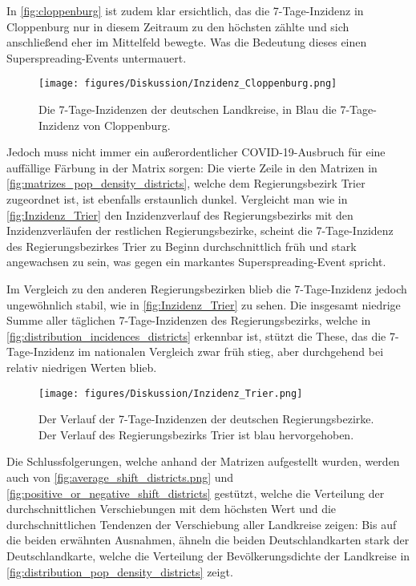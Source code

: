 In \autoref{fig:cloppenburg} ist zudem klar ersichtlich, das die 7-Tage-Inzidenz in Cloppenburg nur in diesem Zeitraum zu den höchsten zählte und sich anschließend eher im Mittelfeld bewegte. Was die Bedeutung dieses einen Superspreading-Events untermauert.
\begin{figure}
    \centering
    \texttt{[image: figures/Diskussion/Inzidenz\_Cloppenburg.png]}
    \caption{Die 7-Tage-Inzidenzen der deutschen Landkreise, in Blau die 7-Tage-Inzidenz von Cloppenburg.}
    \label{fig:cloppenburg}
\end{figure}

Jedoch muss nicht immer ein außerordentlicher COVID-19-Ausbruch für eine auffällige Färbung in der Matrix sorgen: Die vierte Zeile in den Matrizen in \autoref{fig:matrizes_pop_density_districts}, welche dem Regierungsbezirk Trier zugeordnet ist, ist ebenfalls erstaunlich dunkel.
Vergleicht man wie in \autoref{fig:Inzidenz_Trier} den Inzidenzverlauf des Regierungsbezirks mit den Inzidenzverläufen der restlichen Regierungsbezirke, scheint die 7-Tage-Inzidenz des Regierungsbezirkes Trier zu Beginn durchschnittlich früh und stark angewachsen zu sein, was gegen ein markantes Superspreading-Event spricht.

Im Vergleich zu den anderen Regierungsbezirken blieb die 7-Tage-Inzidenz jedoch ungewöhnlich stabil, wie in \autoref{fig:Inzidenz_Trier} zu sehen. Die insgesamt niedrige Summe aller täglichen 7-Tage-Inzidenzen des Regierungsbezirks, welche in \autoref{fig:distribution_incidences_districts} erkennbar ist, stützt die These, das die 7-Tage-Inzidenz im nationalen Vergleich zwar früh stieg, aber durchgehend bei relativ niedrigen Werten blieb.

\begin{figure}[H]
    \centering
    \texttt{[image: figures/Diskussion/Inzidenz\_Trier.png]}
    \caption{Der Verlauf der 7-Tage-Inzidenzen der deutschen Regierungsbezirke. Der Verlauf des Regierungsbezirks Trier ist blau hervorgehoben.}
    \label{fig:Inzidenz_Trier}
\end{figure}



Die Schlussfolgerungen, welche anhand der Matrizen aufgestellt wurden, werden auch von \autoref{fig:average_shift_districts.png} und \autoref{fig:positive_or_negative_shift_districts} gestützt, welche die Verteilung der durchschnittlichen Verschiebungen mit dem höchsten Wert und die durchschnittlichen Tendenzen der Verschiebung aller Landkreise zeigen: Bis auf die beiden erwähnten Ausnahmen, ähneln die beiden Deutschlandkarten stark der Deutschlandkarte, welche die Verteilung der Bevölkerungsdichte der Landkreise in \autoref{fig:distribution_pop_density_districts} zeigt.

